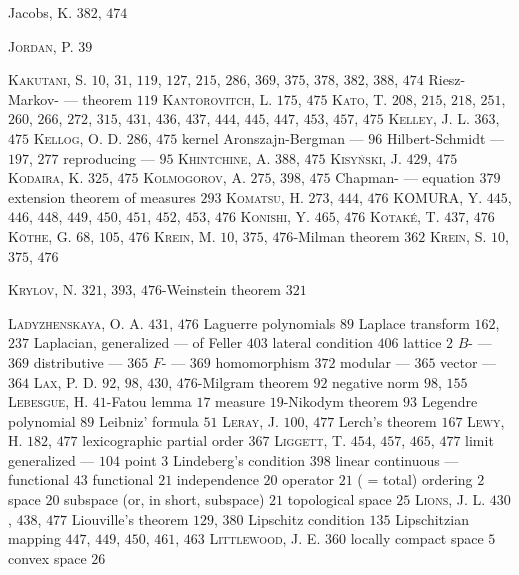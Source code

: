Jacobs, K. $382$, $474$ 

\textsc{Jordan}, P. $39$ 

\textsc{Kakutani}, S. $10$, $31$, $119$, $127$, $215$, $286$, $369$, $375$, $378$, $382$, $388$, $474$ Riesz-Markov- --- theorem $119$ \textsc{Kantorovitch}, L. $175$, $475$ \textsc{Kato}, T. $208$, $215$, $218$, $251$, $260$, $266$, $272$, $315$, $431$, $436$, $437$, $444$, $445$, $447$, $453$, $457$, $475$ \textsc{Kelley}, J. L. $363$, $475$ \textsc{Kellog}, O. D. $286$, $475$ kernel Aronszajn-Bergman --- $96$ Hilbert-Schmidt --- $197$, $277$ reproducing --- $95$ \textsc{Khintchine}, A. $388$, $475$ \textsc{Kisyński}, J. $429$, $475$ \textsc{Kodaira}, K. $325$, $475$ \textsc{Kolmogorov}, A. $275$, $398$, $475$ Chapman- --- equation $379$ extension theorem of measures $293$ \textsc{Komatsu}, H. $273$, $444$, $476$ KOMURA, Y. $445$, $446$, $448$, $449$, $450$, $451$, $452$, $453$, $476$ \textsc{Konishi}, Y. $465$, $476$ \textsc{Kotaké}, T. $437$, $476$ \textsc{Köthe}, G. $68$, $105$, $476$ \textsc{Krein}, M. $10$, $375$, $476$-Milman theorem $362$ \textsc{Krein}, S. $10$, $375$, $476$ 

\textsc{Krylov}, N. $321$, $393$, $476$-Weinstein theorem $321$

\textsc{Ladyzhenskaya}, O. A. $431$, $476$ Laguerre polynomials $89$ Laplace transform $162$, $237$ Laplacian, generalized --- of Feller $403$ lateral condition $406$ lattice $2$ $B$- --- $369$ distributive --- $365$ $F$- --- $369$ homomorphism $372$ modular --- $365$ vector --- $364$ \textsc{Lax}, P. D. $92$, $98$, $430$, $476$-Milgram theorem $92$ negative norm $98$, $155$ \textsc{Lebesgue}, H. $41$-Fatou lemma $17$ measure $19$-Nikodym theorem $93$ Legendre polynomial $89$ Leibniz' formula $51$ \textsc{Leray}, J. $100$, $477$ Lerch's theorem $167$ \textsc{Lewy}, H. $182$, $477$ lexicographic partial order $367$ \textsc{Liggett}, T. $454$, $457$, $465$, $477$ limit generalized --- $104$ point $3$ Lindeberg's condition $398$ linear continuous --- functional $43$ functional $21$ independence $20$ operator $21$ ( = total) ordering $2$ space $20$ subspace (or, in short, subspace) $21$ topological space $25$ \textsc{Lions}, J. L. $430$, $438$, $477$ Liouville's theorem $129$, $380$ Lipschitz condition $135$ Lipschitzian mapping $447$, $449$, $450$, $461$, $463$ \textsc{Littlewood}, J. E. $360$ locally compact space $5$ convex space $26$ 

